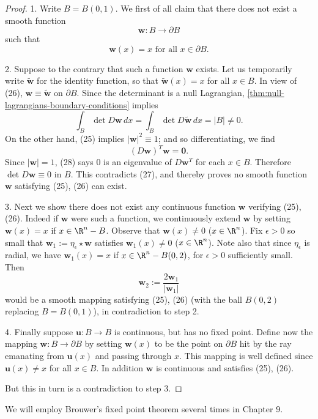 \begin{proof}
1. Write $B = B(0,1)$. We first of all claim that there does not exist a smooth function
\[
\mathbf{w} : B \to \partial B
\tag{25}
\]
such that
\[
\mathbf{w}(x) = x \text{ for all } x \in \partial B.
\tag{26}
\]

2. Suppose to the contrary that such a function $\mathbf{w}$ exists. Let us temporarily write $\tilde{\mathbf{w}}$ for the identity function, so that $\tilde{\mathbf{w}}(x) = x$ for all $x \in B$. In view of (26), $\mathbf{w} \equiv \tilde{\mathbf{w}}$ on $\partial B$. Since the determinant is a null Lagrangian, \cref{thm:null-lagrangians-boundary-conditions} implies
\[
\int_B \det D\mathbf{w}\, dx = \int_B \det D\tilde{\mathbf{w}}\, dx = |B| \neq 0.
\tag{27}
\]
On the other hand, (25) implies $|\mathbf{w}|^2 \equiv 1$; and so differentiating, we find
\[
(D\mathbf{w})^T \mathbf{w} = \mathbf{0}.
\tag{28}
\]
Since $|\mathbf{w}| = 1$, (28) says 0 is an eigenvalue of $D\mathbf{w}^T$ for each $x \in B$. Therefore $\det D\mathbf{w} \equiv 0$ in $B$. This contradicts (27), and thereby proves no smooth function $\mathbf{w}$ satisfying (25), (26) can exist.

3. Next we show there does not exist any continuous function $\mathbf{w}$ verifying (25), (26). Indeed if $\mathbf{w}$ were such a function, we continuously extend $\mathbf{w}$ by setting $\mathbf{w}(x) = x$ if $x \in \R^n - B$. Observe that $\mathbf{w}(x) \neq 0$ ($x \in \R^n$). Fix $\epsilon > 0$ so small that $\mathbf{w}_1 := \eta_\epsilon \star \mathbf{w}$ satisfies $\mathbf{w}_1(x) \neq 0$ ($x \in \R^n$). Note also that since $\eta_\epsilon$ is radial, we have $\mathbf{w}_1(x) = x$ if $x \in \R^n - B(0, 2)$, for $\epsilon > 0$ sufficiently small. Then
\[
\mathbf{w}_2 := \frac{2\mathbf{w}_1}{|\mathbf{w}_1|}
\]
would be a smooth mapping satisfying (25), (26) (with the ball $B(0,2)$ replacing $B = B(0,1)$), in contradiction to step 2.

4. Finally suppose $\mathbf{u} : B \to B$ is continuous, but has no fixed point. Define now the mapping $\mathbf{w} : B \to \partial B$ by setting $\mathbf{w}(x)$ to be the point on $\partial B$ hit by the ray emanating from $\mathbf{u}(x)$ and passing through $x$. This mapping is well defined since $\mathbf{u}(x) \neq x$ for all $x \in B$. In addition $\mathbf{w}$ is continuous and satisfies (25), (26).

But this in turn is a contradiction to step 3.
\end{proof}

We will employ Brouwer's fixed point theorem several times in Chapter 9.

